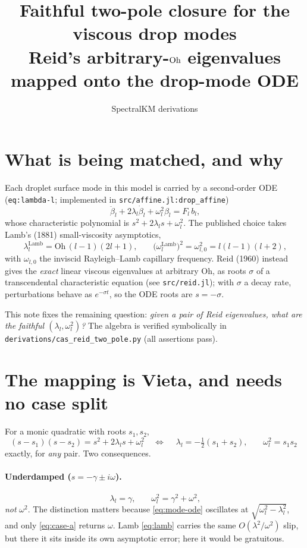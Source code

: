 \documentclass[11pt]{article}
\title{Faithful two-pole closure for the viscous drop modes\\
{\large Reid's arbitrary-$\Oh$ eigenvalues mapped onto the drop-mode ODE}}
\author{SpectralKM derivations}
\date{}
\newcommand{\Oh}{\mathrm{Oh}}
\begin{document}
\maketitle

\section{What is being matched, and why}

Each droplet surface mode in this model is carried by a second-order ODE
(\texttt{eq:lambda-l}; implemented in \texttt{src/affine.jl:drop\_affine})
\begin{equation}
  \ddot\beta_l + 2\lambda_l\dot\beta_l + \omega_l^2\beta_l = F_l\,b_l\text{,}
  \label{eq:mode-ode}
\end{equation}
whose characteristic polynomial is $s^2 + 2\lambda_l s + \omega_l^2$. The published choice
takes Lamb's (1881) small-viscosity asymptotics,
\begin{equation}
  \lambda_l^{\text{Lamb}} = \Oh\,(l-1)(2l+1)\text{,}\qquad
  \big(\omega_l^{\text{Lamb}}\big)^2 = \omega_{l,0}^2 = l(l-1)(l+2)\text{,}
  \label{eq:lamb}
\end{equation}
with $\omega_{l,0}$ the inviscid Rayleigh--Lamb capillary frequency. Reid (1960) instead
gives the \emph{exact} linear viscous eigenvalues at arbitrary $\Oh$, as roots
$\sigma$ of a transcendental characteristic equation (see \texttt{src/reid.jl}); with
$\sigma$ a decay rate, perturbations behave as $e^{-\sigma t}$, so the ODE roots are
$s=-\sigma$.

This note fixes the remaining question: \emph{given a pair of Reid eigenvalues, what are the
faithful $(\lambda_l,\omega_l^2)$?} The algebra is verified symbolically in
\texttt{derivations/cas\_reid\_two\_pole.py} (all assertions pass).

\section{The mapping is Vieta, and needs no case split}

For a monic quadratic with roots $s_1,s_2$,
\begin{equation}
  (s-s_1)(s-s_2) = s^2 + 2\lambda_l s + \omega_l^2
  \quad\Longleftrightarrow\quad
  \boxed{\ \lambda_l = -\tfrac{1}{2}(s_1+s_2)\text{,}\qquad \omega_l^2 = s_1 s_2\ }
  \label{eq:vieta}
\end{equation}
exactly, for \emph{any} pair. Two consequences.

\paragraph{Underdamped ($s = -\gamma \pm i\omega$).}
\begin{equation}
  \lambda_l = \gamma\text{,}\qquad \omega_l^2 = \gamma^2 + \omega^2\text{,}
  \label{eq:case-a}
\end{equation}
\emph{not} $\omega^2$. The distinction matters because \eqref{eq:mode-ode} oscillates at
$\sqrt{\omega_l^2-\lambda_l^2}$, and only \eqref{eq:case-a} returns $\omega$. Lamb
\eqref{eq:lamb} carries the same $O(\lambda^2/\omega^2)$ slip, but there it sits inside its
own asymptotic error; here it would be gratuitous.
\end{document}
